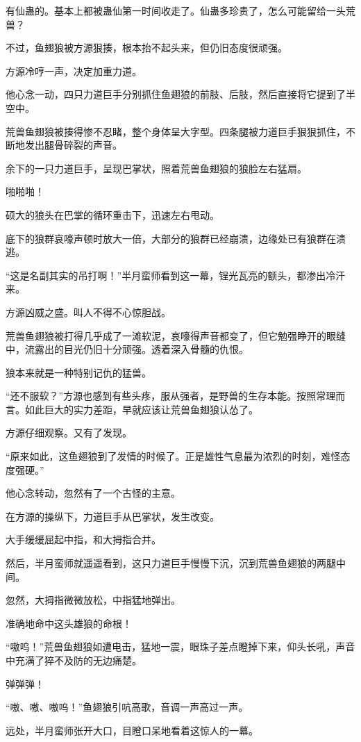 \begin{this_body}
有仙蛊的。基本上都被蛊仙第一时间收走了。仙蛊多珍贵了，怎么可能留给一头荒兽？

不过，鱼翅狼被方源狠揍，根本抬不起头来，但仍旧态度很顽强。

方源冷哼一声，决定加重力道。

他心念一动，四只力道巨手分别抓住鱼翅狼的前肢、后肢，然后直接将它提到了半空中。

荒兽鱼翅狼被揍得惨不忍睹，整个身体呈大字型。四条腿被力道巨手狠狠抓住，不断地发出腿骨碎裂的声音。

余下的一只力道巨手，呈现巴掌状，照着荒兽鱼翅狼的狼脸左右猛扇。

啪啪啪！

硕大的狼头在巴掌的循环重击下，迅速左右甩动。

底下的狼群哀嚎声顿时放大一倍，大部分的狼群已经崩溃，边缘处已有狼群在溃逃。

“这是名副其实的吊打啊！”半月蛮师看到这一幕，锃光瓦亮的额头，都渗出冷汗来。

方源凶威之盛。叫人不得不心惊胆战。

荒兽鱼翅狼被打得几乎成了一滩软泥，哀嚎得声音都变了，但它勉强睁开的眼缝中，流露出的目光仍旧十分顽强。透着深入骨髓的仇恨。

狼本来就是一种特别记仇的猛兽。

“还不服软？”方源也感到有些头疼，服从强者，是野兽的生存本能。按照常理而言。如此巨大的实力差距，早就应该让荒兽鱼翅狼认怂了。

方源仔细观察。又有了发现。

“原来如此，这鱼翅狼到了发情的时候了。正是雄性气息最为浓烈的时刻，难怪态度强硬。”

他心念转动，忽然有了一个古怪的主意。

在方源的操纵下，力道巨手从巴掌状，发生改变。

大手缓缓屈起中指，和大拇指合并。

然后，半月蛮师就遥遥看到，这只力道巨手慢慢下沉，沉到荒兽鱼翅狼的两腿中间。

忽然，大拇指微微放松，中指猛地弹出。

准确地命中这头雄狼的命根！

“嗷呜！”荒兽鱼翅狼如遭电击，猛地一震，眼珠子差点瞪掉下来，仰头长吼，声音中充满了猝不及防的无边痛楚。

弹弹弹！

“嗷、嗷、嗷呜！”鱼翅狼引吭高歌，音调一声高过一声。

远处，半月蛮师张开大口，目瞪口呆地看着这惊人的一幕。


\end{this_body}
